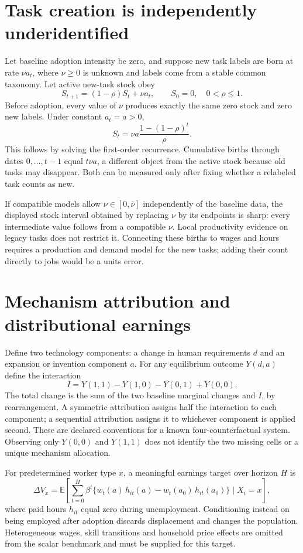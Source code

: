 \documentclass[11pt]{article}
\newcommand{\E}{\mathbb E}
\begin{document}
\section*{Task creation is independently underidentified}
Let baseline adoption intensity be zero, and suppose new task labels are born at rate $\nu a_t$, where $\nu\geq0$ is unknown and labels come from a stable common taxonomy. Let active new-task stock obey
\[
 S_{t+1}=(1-\rho)S_t+\nu a_t,\qquad S_0=0,\quad 0<\rho\leq1.
\]
Before adoption, every value of $\nu$ produces exactly the same zero stock and zero new labels. Under constant $a_t=a>0$,
\[
 S_t=\nu a\frac{1-(1-\rho)^t}{\rho}.
\]
This follows by solving the first-order recurrence. Cumulative births through dates $0,\ldots,t-1$ equal $t\nu a$, a different object from the active stock because old tasks may disappear. Both can be measured only after fixing whether a relabeled task counts as new.

If compatible models allow $\nu\in[0,\bar\nu]$ independently of the baseline data, the displayed stock interval obtained by replacing $\nu$ by its endpoints is sharp: every intermediate value follows from a compatible $\nu$. Local productivity evidence on legacy tasks does not restrict it. Connecting these births to wages and hours requires a production and demand model for the new tasks; adding their count directly to jobs would be a units error.

\section*{Mechanism attribution and distributional earnings}
Define two technology components: a change in human requirements $d$ and an expansion or invention component $a$. For any equilibrium outcome $Y(d,a)$ define the interaction
\[
 I=Y(1,1)-Y(1,0)-Y(0,1)+Y(0,0).
\]
The total change is the sum of the two baseline marginal changes and $I$, by rearrangement. A symmetric attribution assigns half the interaction to each component; a sequential attribution assigns it to whichever component is applied second. These are declared conventions for a known four-counterfactual system. Observing only $Y(0,0)$ and $Y(1,1)$ does not identify the two missing cells or a unique mechanism allocation.

For predetermined worker type $x$, a meaningful earnings target over horizon $H$ is
\[
 \Delta V_x=\E\left[\sum_{t=0}^H\beta^t
 \{w_t(a)\,h_{it}(a)-w_t(a_0)\,h_{it}(a_0)\}\mid X_i=x\right],
\]
where paid hours $h_{it}$ equal zero during unemployment. Conditioning instead on being employed after adoption discards displacement and changes the population. Heterogeneous wages, skill transitions and household price effects are omitted from the scalar benchmark and must be supplied for this target.
\end{document}
